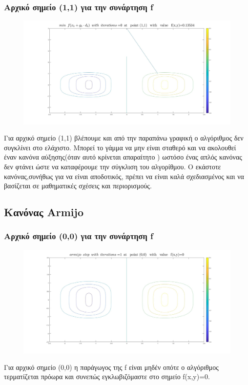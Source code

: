 \documentclass{article}
\begin{document}
\subsubsection*{Αρχικό σημείο (1,1) για την συνάρτηση f}
\begin{figure}[h!]	
     \centering  
     \advance\leftskip-0.2cm  
  \includegraphics[width=130mm,scale=2]{mfc.jpg}
\end{figure} 
Για αρχικό σημείο (1,1) βλέπουμε και από την παραπάνω γραφική ο αλγόριθμος  δεν συγκλίνει στο ελάχιστο. Μπορεί το γάμμα  να μην είναι σταθερό και να ακολουθεί έναν κανόνα αύξησης(όταν αυτό κρίνεται απαραίτητο ) ωστόσο ένας απλός κανόνας δεν φτάνει ώστε να καταφέρουμε την σύγκλιση του αλγορίθμου. Ο εκάστοτε κανόνας,συνήθως για να είναι αποδοτικός, πρέπει να είναι καλά σχεδιασμένος και να βασίζεται σε μαθηματικές σχέσεις και περιορισμούς. 
\clearpage
 \subsection*{Κανόνας Armijo}
\subsubsection*{Αρχικό σημείο (0,0) για την συνάρτηση f}
\begin{figure}[h!]	
     \centering  
     \advance\leftskip-0.2cm  
  \includegraphics[width=130mm,scale=2]{arm1.jpg}
\end{figure} 
Για αρχικό σημείο (0,0) η παράγωγος της f είναι μηδέν οπότε ο αλγόριθμος τερματίζεται πρόωρα και συνεπώς εγκλωβιζόμαστε στο σημείο f(x,y)=0.
\end{document}

